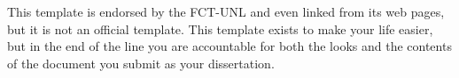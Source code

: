 This template is endorsed by the FCT-UNL and even linked from its web pages, but it is not an official template.
%
This template exists to make your life easier, but in the end of the line you are accountable for both the looks and the contents of the document you submit as your dissertation.

%
%
%
%
%
%
